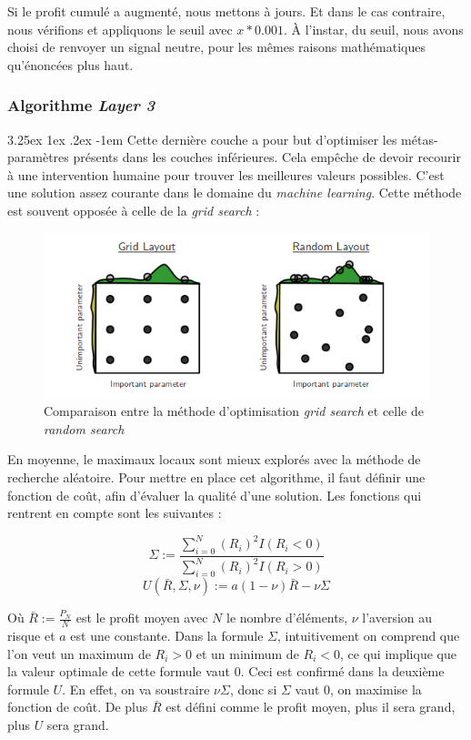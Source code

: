 \documentclass[a4paper, 11pt]{article}
\makeatletter
\renewcommand\paragraph{\@startsection{paragraph}{5}{\z@}%
  {3.25ex \@plus1ex \@minus.2ex}%
  {-1em}%
  {\normalfont\normalsize\bfseries}}
\makeatother
\begin{document}
Si le profit cumulé a augmenté, nous mettons à jours. Et dans le cas contraire, nous vérifions et appliquons le seuil avec $x * 0.001$.
À l'instar, du seuil, nous avons choisi de renvoyer un signal neutre, pour les mêmes raisons mathématiques qu'énoncées plus haut.

\subsubsection{Algorithme \textit{Layer 3}}
\paragraph{}
Cette dernière couche a pour but d'optimiser les métas-paramètres présents dans les couches inférieures. Cela empêche de devoir recourir à une intervention
humaine pour trouver les meilleures valeurs possibles. C'est une solution assez courante dans le domaine du \textit{machine learning}. Cette méthode est
souvent opposée à celle de la \textit{grid search} \cite{grid_vs_random}:
\begin{figure}[H]
\centering
\includegraphics[scale=0.75]{images/grid_vs_random}
\caption{Comparaison entre la méthode d'optimisation \textit{grid search} et celle de \textit{random search}}
\end{figure}

En moyenne, le maximaux locaux sont mieux explorés avec la méthode de recherche aléatoire. Pour mettre en place cet algorithme, il faut définir une
fonction de coût, afin d'évaluer la qualité d'une solution.
Les fonctions qui rentrent en compte sont les suivantes :
\begin{center}
 $$ \Sigma := \frac{\sum_{i=0}^N (R_i)^2 I (R_i < 0)}{\sum_{i=0}^N (R_i)^2 I (R_i > 0)}$$
 $$ U(\bar{R}, \Sigma, \nu) := a (1 - \nu) \bar{R} - \nu \Sigma$$
\end{center}

Où $\bar{R} := \frac{P_N}{N}$ est le profit moyen avec $N$ le nombre d'éléments, $\nu$ l'aversion au risque et $a$ est une constante.
Dans la formule $\Sigma$, intuitivement on comprend que l'on veut un maximum de $R_i > 0$ et un minimum de $R_i < 0$, ce qui implique que la valeur
optimale de cette formule vaut $0$. Ceci est confirmé dans la deuxième formule $U$. En effet, on va soustraire $\nu \Sigma$, donc si $\Sigma$ vaut $0$,
on maximise la fonction de coût. De plus $\bar{R}$ est défini comme le profit moyen, plus il sera grand, plus $U$ sera grand.
\end{document}
